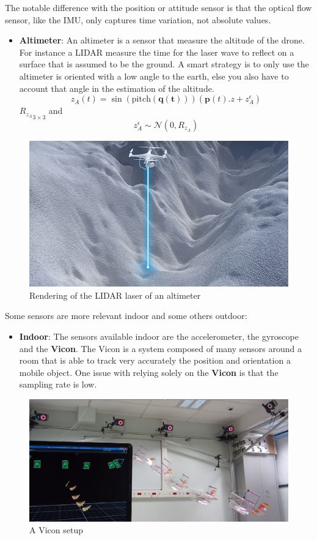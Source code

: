 \documentclass[]{article}
\providecommand{\tightlist}{%
  \setlength{\itemsep}{0pt}\setlength{\parskip}{0pt}}
\begin{document}
The notable difference with the position or attitude sensor is that the
optical flow sensor, like the IMU, only captures time variation, not
absolute values.

\begin{itemize}
\tightlist
\item
  \textbf{Altimeter}: An altimeter is a sensor that measure the altitude
  of the drone. For instance a LIDAR measure the time for the laser wave
  to reflect on a surface that is assumed to be the ground. A smart
  strategy is to only use the altimeter is oriented with a low angle to
  the earth, else you also have to account that angle in the estimation
  of the altitude.
  \[z_A(t) = \sin(\text{pitch}(\mathbf{q(t)}))(\mathbf{p}(t).z + z_A^\epsilon)\]
  \({R_{z_A}}_{3 \times 3}\) and
  \[z_A^\epsilon \sim \mathcal{N}(0, R_{z_A})\]
\end{itemize}

\begin{figure}
\centering
\includegraphics{altimeter.jpg}
\caption{Rendering of the LIDAR laser of an altimeter}
\end{figure}

Some sensors are more relevant indoor and some others outdoor:

\begin{itemize}
\tightlist
\item
  \textbf{Indoor}: The sensors available indoor are the accelerometer,
  the gyroscope and the \textbf{Vicon}. The Vicon is a system composed
  of many sensors around a room that is able to track very accurately
  the position and orientation a mobile object. One issue with relying
  solely on the \textbf{Vicon} is that the sampling rate is low.
\end{itemize}

\begin{figure}
\centering
\includegraphics{vicon.jpg}
\caption{A Vicon setup}
\end{figure}
\end{document}
